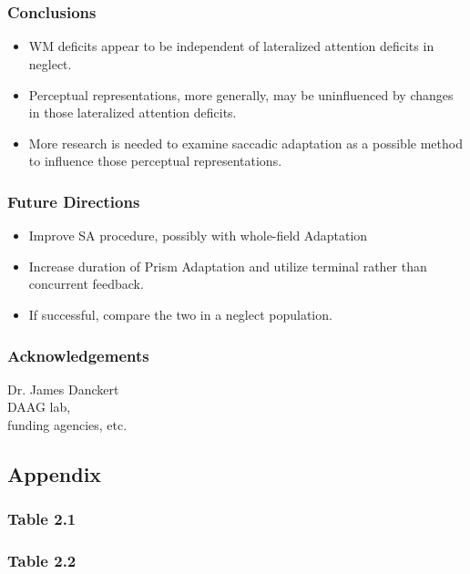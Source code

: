 \documentclass{beamer}
\begin{document}
\section*{}
\begin{frame}
	\frametitle{Conclusions}
	\begin{itemize}
		\item WM deficits appear to be independent of lateralized attention deficits in neglect.
		\item Perceptual representations, more generally, may be uninfluenced by changes in those lateralized attention deficits.
		\item More research is needed to examine saccadic adaptation as a possible method to influence those perceptual representations.
	\end{itemize}
\end{frame}

\begin{frame}
	\frametitle{Future Directions}
	\begin{itemize}
		\item Improve SA procedure, possibly with whole-field Adaptation
		\item Increase duration of Prism Adaptation and utilize terminal rather than concurrent feedback.
		\item If successful, compare the two in a neglect population.
	\end{itemize}
\end{frame}

\begin{frame}
	\frametitle{Acknowledgements}
	Dr. James Danckert\\
	DAAG lab,\\
	funding agencies, etc.
\end{frame}


\subsection*{Appendix}
\begin{frame}[noframenumbering]
	\frametitle{Table 2.1}
\end{frame}

\begin{frame}[noframenumbering]
	\frametitle{Table 2.2}
	
\end{frame}
\end{document}
